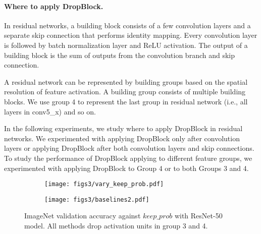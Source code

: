 \documentclass{article}
\begin{document}
\paragraph{Where to apply DropBlock.}
In residual networks, a building block consists of a few convolution layers and a separate skip connection that performs identity mapping. Every convolution layer is followed by batch normalization layer and ReLU activation. The output of a building block is the sum of outputs from the convolution branch and skip connection.

A residual network can be represented by building groups based on the spatial resolution of feature activation. A building group consists of multiple building blocks. We use group 4 to represent the last group in residual network (i.e., all layers in conv5\_x) and so on. 

In the following experiments, we study where to apply DropBlock in residual networks. We experimented with applying DropBlock only after convolution layers or applying DropBlock after both convolution layers and skip connections. To study the performance of DropBlock applying to different feature groups, we experimented with applying DropBlock to Group 4 or to both Groups 3 and 4.

\begin{figure}[t!]
  \centering
  \begin{subfigure}[b]{0.45\textwidth}
    \texttt{[image: figs3/vary\_keep\_prob.pdf]}
    \caption{}
  \end{subfigure}
  \begin{subfigure}[b]{0.45\textwidth}
    \texttt{[image: figs3/baselines2.pdf]}
    \caption{}
  \end{subfigure}
  \caption{ImageNet validation accuracy against $keep\_prob$ with ResNet-50 model. All methods drop activation units in group 3 and 4.}
  \label{fig:resnet_vary_keepprob}
\end{figure}
\end{document}
